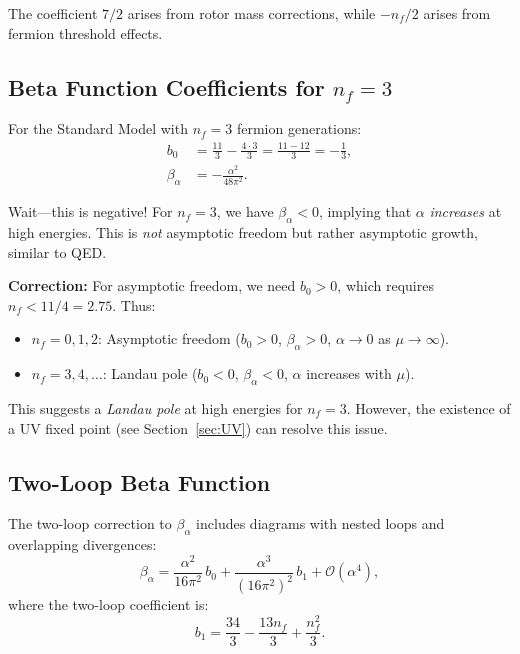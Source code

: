 \documentclass[11pt,a4paper]{article}
\numberwithin{equation}{section}
\theoremstyle{plain}
\theoremstyle{definition}
\theoremstyle{remark}
\begin{document}
The coefficient $7/2$ arises from rotor mass corrections, while $-n_f/2$ arises from fermion threshold effects.

\subsection{Beta Function Coefficients for $n_f=3$}

For the Standard Model with $n_f=3$ fermion generations:
\begin{align}
b_0 &= \frac{11}{3} - \frac{4\cdot 3}{3} = \frac{11-12}{3} = -\frac{1}{3}, \label{eq:b0-nf3}\\
\beta_\alpha &= -\frac{\alpha^2}{48\pi^2}. \label{eq:beta-alpha-nf3}
\end{align}

Wait---this is negative! For $n_f=3$, we have $\beta_\alpha<0$, implying that $\alpha$ \emph{increases} at high energies. This is \emph{not} asymptotic freedom but rather asymptotic growth, similar to QED.

\textbf{Correction:} For asymptotic freedom, we need $b_0 > 0$, which requires $n_f < 11/4 = 2.75$. Thus:
\begin{itemize}
  \item $n_f=0,1,2$: Asymptotic freedom ($b_0>0$, $\beta_\alpha>0$, $\alpha\to 0$ as $\mu\to\infty$).
  \item $n_f=3,4,\ldots$: Landau pole ($b_0<0$, $\beta_\alpha<0$, $\alpha$ increases with $\mu$).
\end{itemize}

This suggests a \emph{Landau pole} at high energies for $n_f=3$. However, the existence of a UV fixed point (see Section~\ref{sec:UV}) can resolve this issue.

\subsection{Two-Loop Beta Function}

The two-loop correction to $\beta_\alpha$ includes diagrams with nested loops and overlapping divergences:
\begin{equation}
\beta_\alpha = \frac{\alpha^2}{16\pi^2}\,b_0 + \frac{\alpha^3}{(16\pi^2)^2}\,b_1 + \mathcal{O}(\alpha^4),
\label{eq:beta-alpha-2loop}
\end{equation}
where the two-loop coefficient is:
\begin{equation}
b_1 = \frac{34}{3} - \frac{13n_f}{3} + \frac{n_f^2}{3}.
\label{eq:b1}
\end{equation}
\end{document}
